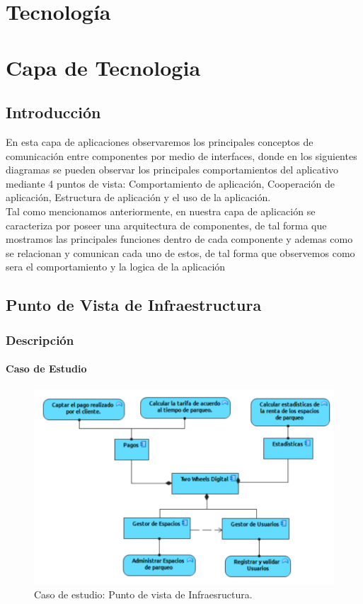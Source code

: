 \chapter{Tecnología}

\chapter{Capa de Tecnologia}

\section{Introducción}
En esta capa de aplicaciones observaremos los principales conceptos de comunicación entre componentes por medio de interfaces, donde en los siguientes diagramas se pueden observar los principales comportamientos del aplicativo mediante 4 puntos de vista: Comportamiento de aplicación, Cooperación de aplicación, Estructura de aplicación y el uso de la aplicación.\\
Tal como mencionamos anteriormente, en nuestra capa de aplicación se caracteriza por poseer una arquitectura de componentes, de tal forma que  mostramos las principales funciones dentro de cada componente y ademas como se relacionan y comunican cada uno de estos, de tal forma que observemos como sera el comportamiento y la logica de la aplicación

\section{Punto de Vista de Infraestructura}
\subsection{Descripción}


\subsubsection{Caso de Estudio}


\begin{figure}[H]
	\centering
	\includegraphics[width=1.0\textwidth]{imagenes/Caso_Estudio/Tecnologia/ComAplicacion.PDF}
	\caption{Caso de estudio: Punto de vista de Infraesructura.}
	\label{fig:gap_analysis}
\end{figure}

